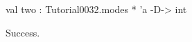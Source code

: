 \runverbatimtrue
{}
\begin{RunVerbatimMsg}
val two : Tutorial0032.modes * 'a -D-> int
\end{RunVerbatimMsg}
\begin{RunVerbatimErr}
Success.
\end{RunVerbatimErr}
